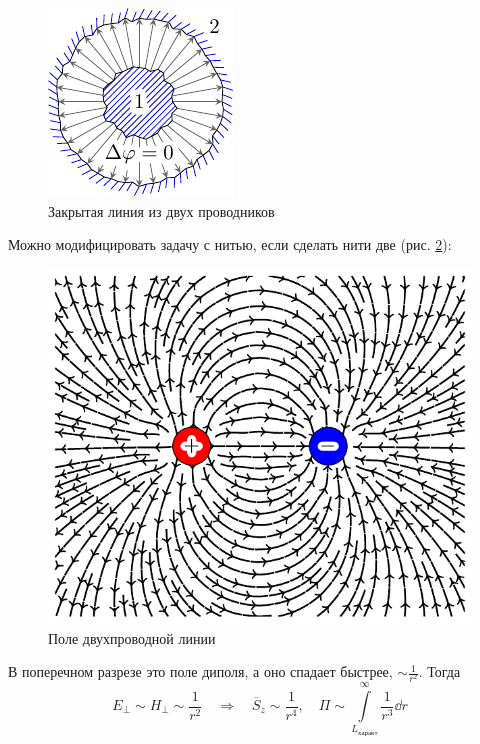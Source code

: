 \begin{figure}[H]
	\centering
	\includegraphics[scale=1.5]{img/lect4_ris4}
	\caption{Закрытая линия из двух проводников}
	\label{fig:lect4:4}
\end{figure}

Можно модифицировать задачу с нитью, если сделать нити две (рис. \ref{fig:lect4:5}):

\begin{figure}[H]
	\centering
	\includegraphics[scale=0.7]{img/lect4_ris5}
	\caption{Поле двухпроводной линии}
	\label{fig:lect4:5}
\end{figure}

В поперечном разрезе это поле диполя, а оно спадает быстрее, $\sim \frac{1}{r^2}$. Тогда
\begin{equation}
	E_\perp\sim H_\perp \sim \frac{1}{r^2}
	\quad \Rightarrow \quad
	\overline{S}_z \sim \frac{1}{r^4}, \quad
	\Pi \sim \int\limits_{L_\text{характ}}^\infty \frac{1}{r^3} \dd{r}
\end{equation}

